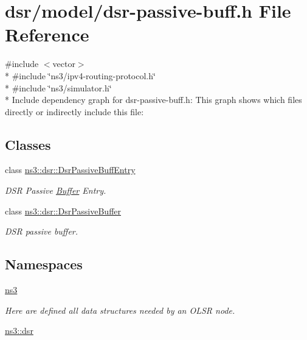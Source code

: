 \hypertarget{dsr-passive-buff_8h}{}\section{dsr/model/dsr-\/passive-\/buff.h File Reference}
\label{dsr-passive-buff_8h}
{\ttfamily \#include $<$vector$>$}\\*
{\ttfamily \#include \char`\"{}ns3/ipv4-\/routing-\/protocol.\+h\char`\"{}}\\*
{\ttfamily \#include \char`\"{}ns3/simulator.\+h\char`\"{}}\\*
Include dependency graph for dsr-\/passive-\/buff.h\+:
This graph shows which files directly or indirectly include this file\+:
\subsection*{Classes}
\begin{DoxyCompactItemize}
\item 
class \hyperlink{classns3_1_1dsr_1_1DsrPassiveBuffEntry}{ns3\+::dsr\+::\+Dsr\+Passive\+Buff\+Entry}
\begin{DoxyCompactList}\small\item\em D\+SR Passive \hyperlink{classns3_1_1Buffer}{Buffer} Entry. \end{DoxyCompactList}\item 
class \hyperlink{classns3_1_1dsr_1_1DsrPassiveBuffer}{ns3\+::dsr\+::\+Dsr\+Passive\+Buffer}
\begin{DoxyCompactList}\small\item\em D\+SR passive buffer. \end{DoxyCompactList}\end{DoxyCompactItemize}
\subsection*{Namespaces}
\begin{DoxyCompactItemize}
\item 
 \hyperlink{namespacens3}{ns3}
\begin{DoxyCompactList}\small\item\em Here are defined all data structures needed by an O\+L\+SR node. \end{DoxyCompactList}\item 
 \hyperlink{namespacens3_1_1dsr}{ns3\+::dsr}
\end{DoxyCompactItemize}
